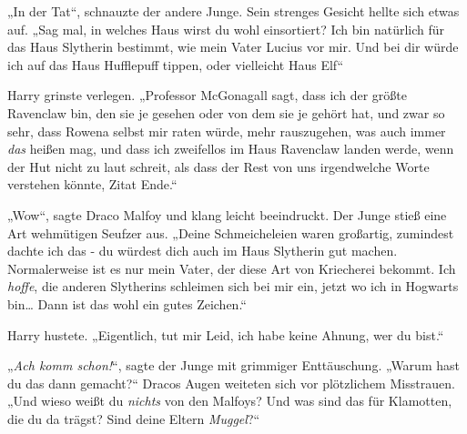 „In der Tat“, schnauzte der andere Junge. Sein strenges Gesicht hellte sich etwas auf. „Sag mal, in welches Haus wirst du wohl einsortiert? Ich bin natürlich für das Haus Slytherin bestimmt, wie mein Vater Lucius vor mir. Und bei dir würde ich auf das Haus Hufflepuff tippen, oder vielleicht Haus Elf“

Harry grinste verlegen. „Professor McGonagall sagt, dass ich der größte Ravenclaw bin, den sie je gesehen oder von dem sie je gehört hat, und zwar so sehr, dass Rowena selbst mir raten würde, mehr rauszugehen, was auch immer \emph{das} heißen mag, und dass ich zweifellos im Haus Ravenclaw landen werde, wenn der Hut nicht zu laut schreit, als dass der Rest von uns irgendwelche Worte verstehen könnte, Zitat Ende.“

„Wow“, sagte Draco Malfoy und klang leicht beeindruckt. Der Junge stieß eine Art wehmütigen Seufzer aus. „Deine Schmeicheleien waren großartig, zumindest dachte ich das - du würdest dich auch im Haus Slytherin gut machen. Normalerweise ist es nur mein Vater, der diese Art von Kriecherei bekommt. Ich \emph{hoffe}, die anderen Slytherins schleimen sich bei mir ein, jetzt wo ich in Hogwarts bin… Dann ist das wohl ein gutes Zeichen.“

Harry hustete. „Eigentlich, tut mir Leid, ich habe keine Ahnung, wer du bist.“

„\emph{Ach komm schon!}“, sagte der Junge mit grimmiger Enttäuschung. „Warum hast du das dann gemacht?“ Dracos Augen weiteten sich vor plötzlichem Misstrauen. „Und wieso weißt du \emph{nichts} von den Malfoys? Und was sind das für Klamotten, die du da trägst? Sind deine Eltern \emph{Muggel}?“

